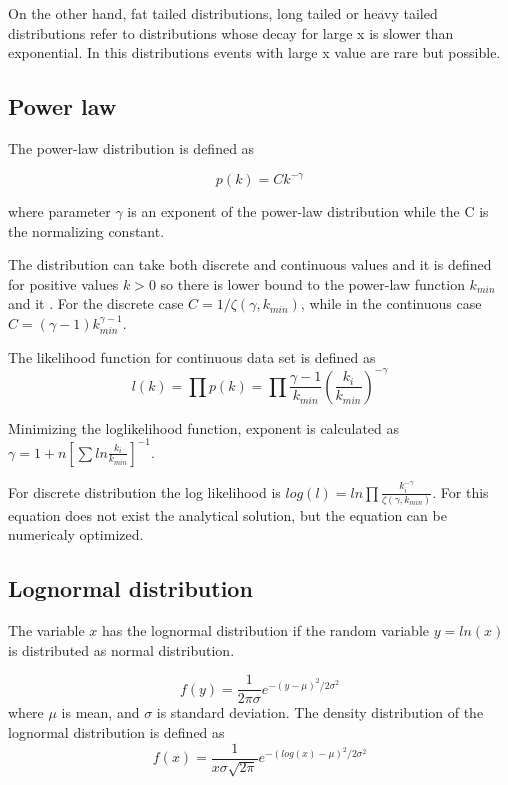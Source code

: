 On the other hand, fat tailed distributions, long tailed or heavy tailed distributions refer to distributions whose decay for large x is slower than exponential. In this distributions events with large x value are rare but possible. 

\subsection{Power law}

The power-law distribution is defined as 

\begin{equation}
p(k) = C k^{-\gamma}
\end{equation}

where parameter $\gamma$ is an exponent of the power-law distribution while the C is the normalizing constant. 

The distribution can take both discrete and continuous values and it is defined for positive values $k>0$ so there is lower bound to the power-law function $k_{min}$ and it . For the discrete case $C=1/\zeta(\gamma, k_{min})$, while in the continuous case $C=(\gamma-1)k_{min}^{\gamma-1}$. 

The likelihood function for continuous data set is defined as 
\begin{equation}
l(k) = \prod p(k) = \prod \frac{\gamma - 1}{ k_{min}}(\frac{k_i}{k_{min}})^{-\gamma}
\end{equation}

Minimizing the loglikelihood function, exponent is calculated as $\gamma = 1+n[\sum ln \frac{k_i}{k_{min}} ]^{-1}$. 

For discrete distribution the log likelihood is $log(l) = ln\prod \frac{k_i^{-\gamma}}{\zeta(\gamma, k_{min})}$. For this equation does not exist the analytical solution, but the equation can be numericaly optimized. \\




\subsection{Lognormal distribution}

The variable $x$ has the lognormal distribution if the random variable $y=ln(x)$ is distributed as normal distribution. 

\begin{equation}
f(y) = \frac{1}{2\pi\sigma}e^{-(y-\mu)^2/2\sigma^2}
\end{equation}
where $\mu$ is mean, and $\sigma$ is standard deviation. The density distribution of the lognormal distribution is defined as
\begin{equation}
f(x) = \frac{1}{x \sigma \sqrt{2\pi}}e^{-(log(x)-\mu)^2 /2\sigma^2} 
\end{equation}

